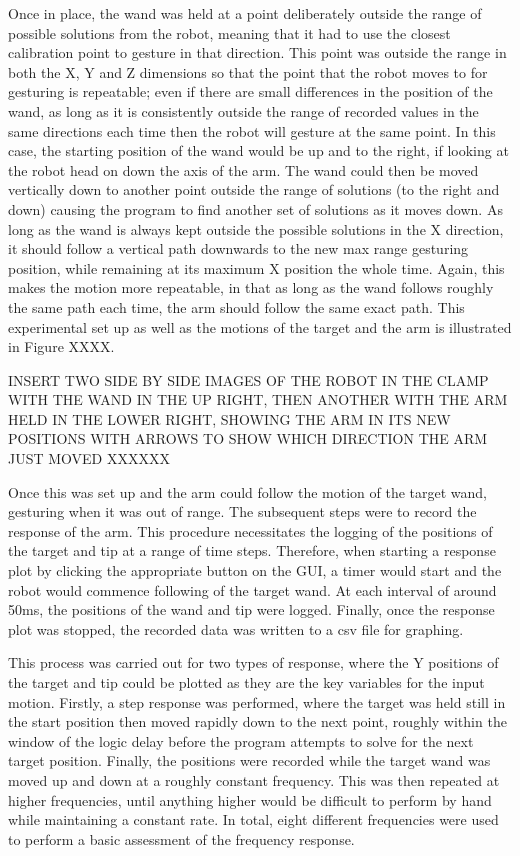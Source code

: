\documentclass[11pt]{article}
\begin{document}
Once in place, the wand was held at a point deliberately outside the range of possible solutions from the robot, meaning that it had to use the closest calibration point to gesture in that direction. This point was outside the range in both the X, Y and Z dimensions so that the point that the robot moves to for gesturing is repeatable; even if there are small differences in the position of the wand, as long as it is consistently outside the range of recorded values in the same directions each time then the robot will gesture at the same point. In this case, the starting position of the wand would be up and to the right, if looking at the robot head on down the axis of the arm. The wand could then be moved vertically down to another point outside the range of solutions (to the right and down) causing the program to find another set of solutions as it moves down. As long as the wand is always kept outside the possible solutions in the X direction, it should follow a vertical path downwards to the new max range gesturing position, while remaining at its maximum X position the whole time. Again, this makes the motion more repeatable, in that as long as the wand follows roughly the same path each time, the arm should follow the same exact path. This experimental set up as well as the motions of the target and the arm is illustrated in Figure XXXX.

INSERT TWO SIDE BY SIDE IMAGES OF THE ROBOT IN THE CLAMP WITH THE WAND IN THE UP RIGHT, THEN ANOTHER WITH THE ARM HELD IN THE LOWER RIGHT, SHOWING THE ARM IN ITS NEW POSITIONS WITH ARROWS TO SHOW WHICH DIRECTION THE ARM JUST MOVED XXXXXX

Once this was set up and the arm could follow the motion of the target wand, gesturing when it was out of range. The subsequent steps were to record the response of the arm. This procedure necessitates the logging of the positions of the target and tip at a range of time steps. Therefore, when starting a response plot by clicking the appropriate button on the GUI, a timer would start and the robot would commence following of the target wand. At each interval of around 50ms, the positions of the wand and tip were logged. Finally, once the response plot was stopped, the recorded data was written to a csv file for graphing. 

This process was carried out for two types of response, where the Y positions of the target and tip could be plotted as they are the key variables for the input motion. Firstly, a step response was performed, where the target was held still in the start position then moved rapidly down to the next point, roughly within the window of the logic delay before the program attempts to solve for the next target position. Finally, the positions were recorded while the target wand was moved up and down at a roughly constant frequency. This was then repeated at higher frequencies, until anything higher would be difficult to perform by hand while maintaining a constant rate. In total, eight different frequencies were used to perform a basic assessment of the frequency response.
\end{document}
